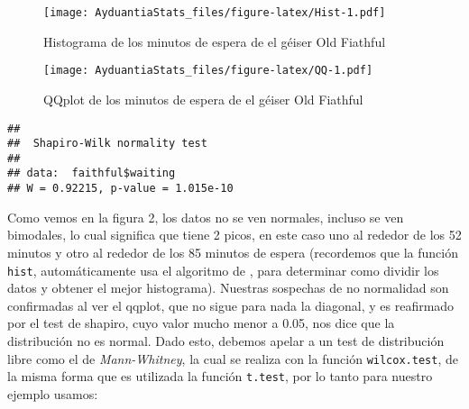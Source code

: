 \documentclass[]{book}
\newenvironment{Shaded}{\begin{snugshade}}{\end{snugshade}}
\newcommand{\KeywordTok}[1]{\textcolor[rgb]{0.13,0.29,0.53}{\textbf{#1}}}
\newcommand{\DataTypeTok}[1]{\textcolor[rgb]{0.13,0.29,0.53}{#1}}
\newcommand{\StringTok}[1]{\textcolor[rgb]{0.31,0.60,0.02}{#1}}
\newcommand{\OperatorTok}[1]{\textcolor[rgb]{0.81,0.36,0.00}{\textbf{#1}}}
\newcommand{\NormalTok}[1]{#1}
\begin{document}
\begin{Shaded}
\end{Shaded}

\begin{figure}
\centering
\texttt{[image: AyduantiaStats\_files/figure-latex/Hist-1.pdf]}
\caption{\label{fig:Hist}Histograma de los minutos de espera de el géiser
Old Fiathful}
\end{figure}

\begin{Shaded}
\end{Shaded}

\begin{figure}
\centering
\texttt{[image: AyduantiaStats\_files/figure-latex/QQ-1.pdf]}
\caption{\label{fig:QQ}QQplot de los minutos de espera de el géiser Old
Fiathful}
\end{figure}

\begin{Shaded}
\end{Shaded}

\begin{verbatim}
## 
##  Shapiro-Wilk normality test
## 
## data:  faithful$waiting
## W = 0.92215, p-value = 1.015e-10
\end{verbatim}

Como vemos en la figura 2, los datos no se ven normales, incluso se ven
bimodales, lo cual significa que tiene 2 picos, en este caso uno al
rededor de los 52 minutos y otro al rededor de los 85 minutos de espera
(recordemos que la función \texttt{hist}, automáticamente usa el
algoritmo de \citet{sturges1926choice}, para determinar como dividir los
datos y obtener el mejor histograma). Nuestras sospechas de no
normalidad son confirmadas al ver el qqplot, que no sigue para nada la
diagonal, y es reafirmado por el test de shapiro, cuyo valor mucho menor
a 0.05, nos dice que la distribución no es normal. Dado esto, debemos
apelar a un test de distribución libre como el de \emph{Mann-Whitney},
la cual se realiza con la función \texttt{wilcox.test}, de la misma
forma que es utilizada la función \texttt{t.test}, por lo tanto para
nuestro ejemplo usamos:
\end{document}
